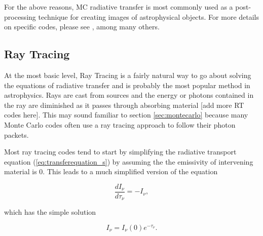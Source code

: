 For the above reasons, MC radiative transfer is most commonly used as a post-processing technique for creating images of astrophysical objects. For more details on specific codes, please see \citet{dullemond12,cantalupoPorciani11,altayEt08,ercolanoEt03,nenkovaEt99,lucy99,harriesHowarth97}, among many others.




\subsection{Ray Tracing}
\label{sec:raytracing}

At the most basic level, Ray Tracing is a fairly natural way to go about solving the equations of radiative transfer and is probably the most popular method in astrophysics. Rays are cast from sources and the energy or photons contained in the ray are diminished as it passes through absorbing material \citep{razoumovScott99,abelNormanMadau99} [add more RT codes here]. This may sound familiar to section \ref{sec:montecarlo} because many Monte Carlo codes often use a ray tracing approach to follow their photon packets.

Most ray tracing codes tend to start by simplifying the radiative transport equation (\ref{eq:transferequation_s}) by assuming the the emissivity of intervening material is 0. This leads to a much simplified version of the equation

\begin{equation}
\label{eq:transferequation_abs}
\frac{dI_{\nu}}{d\tau_{\nu}} = -I_{\nu},
\end{equation}

which has the simple solution

\begin{equation}
\label{eq:transfersolution_abs}
I_{\nu} = I_{\nu}(0)e^{-\tau_{\nu}}.
\end{equation}

